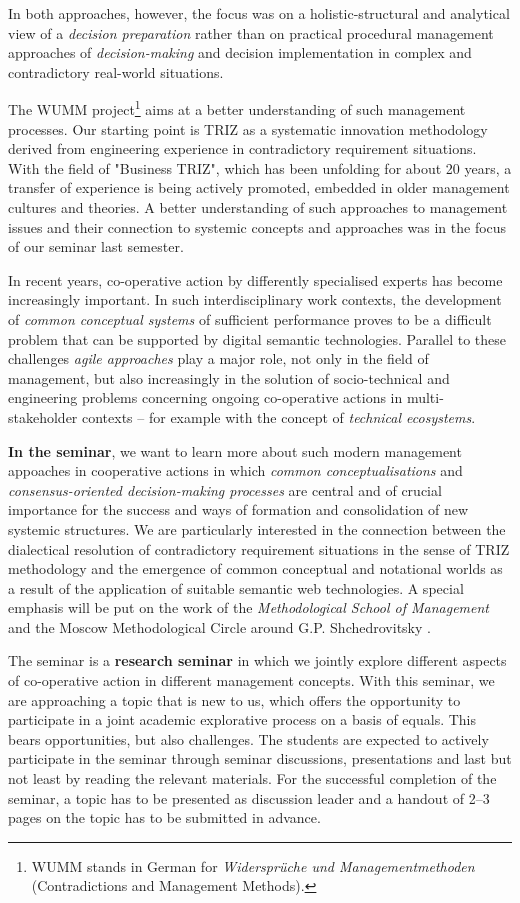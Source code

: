 \documentclass[11pt,a4paper]{article}
\begin{document}
In both approaches, however, the focus was on a holistic-structural and
analytical view of a \emph{decision preparation} rather than on practical
procedural management approaches of \emph{decision-making} and decision
implementation in complex and contradictory real-world situations.

The WUMM project\footnote{WUMM stands in German for \emph{Widersprüche und
    Managementmethoden} (Contradictions and Management Methods).} aims at a
better understanding of such management processes. Our starting point is TRIZ
as a systematic innovation methodology derived from engineering experience in
contradictory requirement situations. With the field of "Business TRIZ", which
has been unfolding for about 20 years, a transfer of experience is being
actively promoted, embedded in older management cultures and theories.  A
better understanding of such approaches to management issues and their
connection to systemic concepts and approaches was in the focus of our seminar
last semester.

In recent years, co-operative action by differently specialised experts has
become increasingly important.  In such interdisciplinary work contexts, the
development of \emph{common conceptual systems} of sufficient performance
proves to be a difficult problem that can be supported by digital semantic
technologies.  Parallel to these challenges \emph{agile approaches} play a
major role, not only in the field of management, but also increasingly in the
solution of socio-technical and engineering problems concerning ongoing
co-operative actions in multi-stakeholder contexts -- for example with the
concept of \emph{technical ecosystems}.

\textbf{In the seminar}, we want to learn more about such modern management
appoaches in cooperative actions in which \emph{common conceptualisations} and
\emph{consensus-oriented decision-making processes} are central and of crucial
importance for the success and ways of formation and consolidation of new
systemic structures.  We are particularly interested in the connection between
the dialectical resolution of contradictory requirement situations in the
sense of TRIZ methodology and the emergence of common conceptual and
notational worlds as a result of the application of suitable semantic web
technologies.  A special emphasis will be put on the work of the
\emph{Methodological School of Management} and the Moscow Methodological
Circle around G.P. Shchedrovitsky \cite{MSM}.

The seminar is a \textbf{research seminar} in which we jointly explore
different aspects of co-operative action in different management concepts.
With this seminar, we are approaching a topic that is new to us, which offers
the opportunity to participate in a joint academic explorative process on a
basis of equals. This bears opportunities, but also challenges.  The students
are expected to actively participate in the seminar through seminar
discussions, presentations and last but not least by reading the relevant
materials.  For the successful completion of the seminar, a topic has to be
presented as discussion leader and a handout of 2--3 pages on the topic has to
be submitted in advance.
\end{document}
